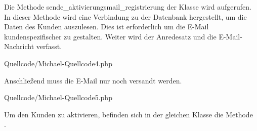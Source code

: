 Die Methode \glqq sende\_aktivierungsmail\_registrierung\grqq{} der Klasse \grqq{} wird aufgerufen. In dieser Methode wird eine Verbindung zu der Datenbank hergestellt, um die Daten des Kunden auszulesen.  Dies ist erforderlich um die E-Mail kundenspezifischer zu gestalten.
Weiter wird der Anredesatz und die E-Mail-Nachricht verfasst.


\begin{center}
	\begin{lstinputlisting}[language=PHP, caption={Die E-Mail versenden}]
		{Quellcode/Michael-Quellcode4.php}
	\end{lstinputlisting}
\end{center}

\newpage
Anschließend muss die E-Mail nur noch versandt werden.


\begin{center}
	\begin{lstinputlisting}[language=PHP, caption={Anredesatz erstellen und E-Mail Nachricht verfassen}]
		{Quellcode/Michael-Quellcode5.php}
	\end{lstinputlisting}
\end{center}

Um den Kunden zu aktivieren, befinden sich in der gleichen Klasse die Methode \\
\grqq{}. 